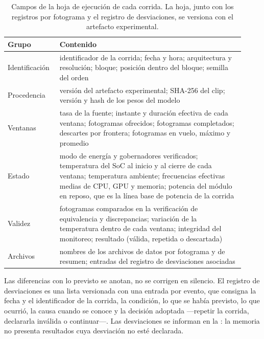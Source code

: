 \begin{table}[htbp]
  \centering
  \caption[Campos de la hoja de ejecución]{Campos de la hoja de ejecución de
  cada corrida. La hoja, junto con los registros por fotograma y el registro
  de desviaciones, se versiona con el artefacto experimental.}
  \label{tab:run-manifest}
  \begin{tabular}{@{}L{0.19\linewidth}L{0.73\linewidth}@{}}
    \toprule
    \textbf{Grupo} & \textbf{Contenido} \\
    \midrule
    Identificación & identificador de la corrida; fecha y hora;
      arquitectura y resolución; bloque; posición dentro del bloque; semilla
      del orden \\
    Procedencia & versión del artefacto experimental; SHA-256 del clip;
      versión y hash de los pesos del modelo \\
    Ventanas & tasa de la fuente; instante y duración efectiva de cada
      ventana; fotogramas ofrecidos; fotogramas completados; descartes por
      frontera; fotogramas en vuelo, máximo y promedio \\
    Estado & modo de energía y gobernadores verificados; temperatura del SoC
      al inicio y al cierre de cada ventana; temperatura ambiente;
      frecuencias efectivas medias de CPU, GPU y memoria; potencia del módulo
      en reposo, que es la línea base de potencia de la corrida \\
    Validez & fotogramas comparados en la verificación de equivalencia y
      discrepancias; variación de la temperatura dentro de cada ventana;
      integridad del monitoreo; resultado (válida, repetida o descartada) \\
    Archivos & nombres de los archivos de datos por fotograma y de resumen;
      entradas del registro de desviaciones asociadas \\
    \bottomrule
  \end{tabular}
\end{table}

Las diferencias con lo previsto se anotan, no se corrigen en silencio. El
registro de desviaciones es una lista versionada con una entrada por evento,
que consigna la fecha y el identificador de la corrida, la condición, lo que
se había previsto, lo que ocurrió, la causa cuando se conoce y la decisión
adoptada ---repetir la corrida, declararla inválida o continuar---. Las
desviaciones se informan en la : la memoria no
presenta resultados cuya desviación no esté declarada.

